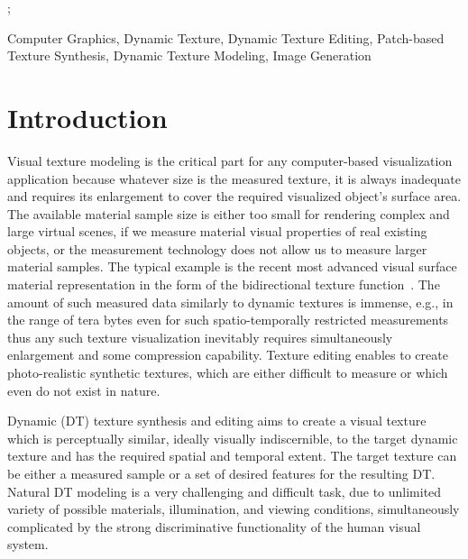 \documentclass{\adsty/acmsiggraph}
\begin{document}
\begin{CRcatlist}
  ;
\end{CRcatlist}

\keywordlist
Computer Graphics,  Dynamic Texture,  Dynamic Texture Editing,  Patch-based Texture Synthesis, Dynamic Texture Modeling, 
 Image Generation
 

\section{Introduction}




Visual texture  modeling is the critical part  for any computer-based visualization application  because whatever size is the measured  texture, it is always inadequate and requires its
enlargement to cover the required visualized object's surface area.
The available material sample size is either too small for rendering  complex and large virtual scenes, if we measure material visual properties of real existing objects, or the measurement technology does not allow us to measure larger material samples.
The typical example is the recent most advanced  visual surface material representation in the form of the bidirectional texture function~\cite{HaiFil13}.
 The amount of such measured data similarly to dynamic textures is immense, e.g., in the range of tera bytes even for such spatio-temporally restricted measurements thus any such texture visualization inevitably requires simultaneously enlargement and some compression capability.
Texture  editing enables to create photo-realistic synthetic textures, which are either difficult to measure or which even do not exist in nature.
	
Dynamic (DT)  texture synthesis and editing aims to create a visual texture  which is perceptually similar, ideally visually indiscernible, to the target dynamic texture and has the
required spatial and temporal extent. The target  texture can be either a measured sample or a set of desired features for the resulting DT.
Natural DT modeling is a very challenging and difficult task, due to unlimited variety of possible  materials, illumination, and viewing conditions, simultaneously complicated by the strong discriminative functionality of the human visual system.
\end{document}
